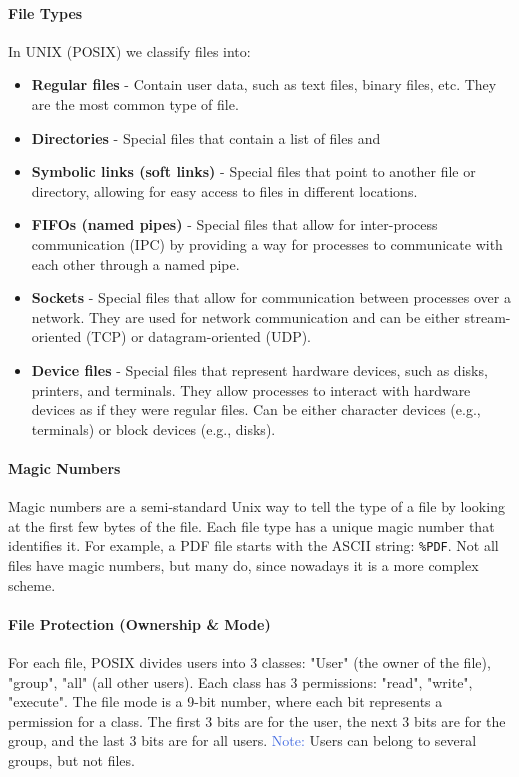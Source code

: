 \documentclass[openany,12pt]{book}
\newcommand{\code}[1]{\texttt{#1}}
\newcommand{\blue}[1]{\textcolor{RoyalBlue}{#1}}
\begin{document}
\paragraph{File Types} In UNIX (POSIX) we classify files into:
\begin{itemize}
  \item \textbf{Regular files} - Contain user data, such as text files, binary files, etc. They are the most common type of file.
  \item \textbf{Directories} - Special files that contain a list of files and
  \item \textbf{Symbolic links (soft links)} - Special files that point to another file or directory, allowing for easy access to files in different locations.
  \item \textbf{FIFOs (named pipes)} - Special files that allow for inter-process communication (IPC) by providing a way for processes to communicate with each other through a named pipe.
  \item \textbf{Sockets} - Special files that allow for communication between processes over a network. They are used for network communication and can be either stream-oriented (TCP) or datagram-oriented (UDP).
  \item \textbf{Device files} - Special files that represent hardware devices, such as disks, printers, and terminals. They allow processes to interact with hardware devices as if they were regular files. Can be either character devices (e.g., terminals) or block devices (e.g., disks).
\end{itemize}


\paragraph{Magic Numbers} Magic numbers are a semi-standard Unix way to tell the type of a file by looking at the first few bytes of the file. Each file type has a unique magic number that identifies it. For example, a PDF file starts with the ASCII string: \code{\%PDF}. Not all files have magic numbers, but many do, since nowadays it is a more complex scheme. 


\paragraph{File Protection (Ownership \& Mode)} For each file, POSIX divides users into 3 classes: "User" (the owner of the file), "group", "all" (all other users). Each class has 3 permissions: "read", "write", "execute". The file mode is a 9-bit number, where each bit represents a permission for a class. The first 3 bits are for the user, the next 3 bits are for the group, and the last 3 bits are for all users. \blue{Note:} Users can belong to several groups, but not files.
\end{document}
